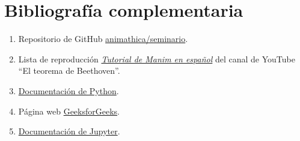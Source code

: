 \documentclass[a4paper]{article}
\begin{document}
\section*{Bibliografía complementaria} \label{Sec: Bibliografía complementaria}

\begin{enumerate}

    \item Repositorio de GitHub \href{https://github.com/animathica/seminario}{animathica/seminario}.

    \item Lista de reproducción \href{https://www.youtube.com/playlist?list=PLcjmqHFN9VeMC9znnNiRMv3nqZv-bU9Fo}{\emph{Tutorial de Manim en español}} del canal de YouTube ``El teorema de Beethoven''.

    \item \href{https://www.python.org/doc/}{Documentación de Python}.

    \item Página web \href{https://www.geeksforgeeks.org/python-programming-language/}{GeeksforGeeks}.

    \item \href{https://docs.jupyter.org/en/latest/}{Documentación de Jupyter}.
\end{enumerate}
\end{document}
